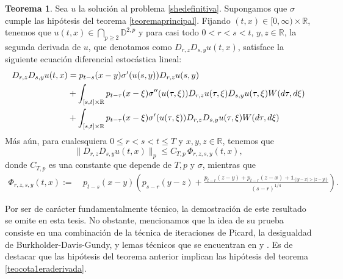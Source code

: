 \documentclass[letterpaper,twoside,12pt]{book}
\newcommand{\R}{\mathbb{R}}
\newcommand{\D}{\mathbb{D}}
\newcommand{\1}{\mathds{1}}
\newcommand{\abs}[1]{\left\lvert #1 \right\rvert}
\theoremstyle{definition}
\theoremstyle{definition}
\newtheorem{teo}{Teorema}
\theoremstyle{remark}
\theoremstyle{definition}
\theoremstyle{definition}
\theoremstyle{definition}
\theoremstyle{definition}
\theoremstyle{definition}
\begin{document}
 \begin{teo}\label{teocota2daderivada}
   Sea $u$ la solución al problema \eqref{shedefinitiva}. Supongamos que $\sigma$ cumple las hipótesis del teorema \ref{teoremaprincipal}. Fijando $(t,x)\in [0,\infty)\times \R$, tenemos que $u(t,x)\in \bigcap_{p\geq2}\D^{2,p}$ y para casi todo $0<r<s<t$, $y,z\in \R$, la segunda derivada de $u$, que denotamos como $D_{r,z}D_{s,y}u(t,x)$, satisface la siguiente ecuación diferencial estocástica lineal:
   \begin{align}
      D_{r,z}D_{s,y}u(t,x)&=p_{t-s}(x-y)\sigma'(u(s,y))D_{r,z}u(s,y)\notag\\
      &+\int_{[s,t]\times \R}p_{t-\tau}(x-\xi)\sigma''(u(\tau,\xi))D_{r,z}u(\tau,\xi)D_{s,y}u(\tau,\xi)W(d\tau,d\xi)\notag\\
      &+\int_{[s,t]\times \R}p_{t-\tau}(x-\xi)\sigma'(u(\tau,\xi))D_{r,z}D_{s,y}u(\tau,\xi)W(d\tau,d\xi)\label{formula2daderivada}
   \end{align}
   Más aún, para cualesquiera $0\leq r<s<t\leq T$  y $x,y,z\in \R$, tenemos que 
   \begin{equation}\label{cota2daderivada}
         \|D_{r,z}D_{s,y}u(t,x)\|_p\leq C_{T,p \ }\Phi_{r,z,s,y}(t,x),
   \end{equation}
   donde $C_{T,p}$ es una constante que depende de $T,p$ y $\sigma$, mientras que
      \begin{align*}
          \Phi_{r,z,s,y}(t,x):= & \ p_{t-s}(x-y)\left(p_{s-r}(y-z)+\frac{p_{t-r}(z-y)+p_{t-r}(z-x)+\1_{\{\abs{y-x}>\abs{z-y}\}}}{(s-r)^{1/4}}\right).
      \end{align*} 
   \end{teo}
   Por ser de carácter fundamentalmente técnico, la demostración de este resultado se omite en esta tesis. No obstante, mencionamos que la idea de su prueba consiste en una combinación de la técnica de iteraciones de Picard, la desigualdad de Burkholder-Davis-Gundy, y lemas técnicos que se encuentran en \cite[lema A.1]{HUANG20207170} y \cite[lema A.1, lema A.2]{KUZGUN202268}. Es de destacar que las hipótesis del teorema anterior implican las hipótesis del teorema \ref{teocota1eraderivada}.
\end{document}
